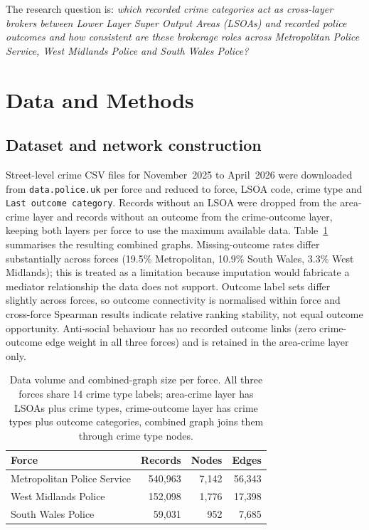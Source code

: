 \documentclass[conference,a4paper]{IEEEtran}
\begin{document}
The research question is: \textit{which recorded crime categories act
as cross-layer brokers between Lower Layer Super Output Areas
(LSOAs) and recorded police
outcomes and how consistent are these brokerage roles across
Metropolitan Police Service, West Midlands Police and South Wales Police?}

\section{Data and Methods}

\subsection{Dataset and network construction}

Street-level crime CSV files for November~2025 to April~2026 were
downloaded from \texttt{data.police.uk} per force and reduced to
force, LSOA code, crime type and \texttt{Last outcome category}.
Records without an LSOA were dropped from the area-crime layer and
records without an outcome from the crime-outcome layer, keeping both
layers per force to use the maximum available data.
Table~\ref{tab:data} summarises the resulting combined graphs.
Missing-outcome rates differ substantially across forces (19.5\%
Metropolitan, 10.9\% South Wales, 3.3\% West Midlands); this is treated
as a limitation because imputation would fabricate a mediator
relationship the data does not support.
Outcome label sets differ slightly across forces, so outcome
connectivity is normalised within force and cross-force
Spearman results indicate relative ranking stability, not
equal outcome opportunity.
Anti-social behaviour has no recorded outcome links (zero crime-outcome
edge weight in all three forces) and is retained in the area-crime
layer only.

\begin{table}[h]
\centering
\small
\caption{Data volume and combined-graph size per force. All three
  forces share 14 crime type labels; area-crime layer has LSOAs plus
  crime types, crime-outcome layer has crime types plus outcome
  categories, combined graph joins them through crime type nodes.}
\label{tab:data}
\begin{tabular}{lrrr}
\toprule
Force & Records & Nodes & Edges \\
\midrule
Metropolitan Police Service & 540{,}963 & 7{,}142 & 56{,}343 \\
West Midlands Police & 152{,}098 & 1{,}776 & 17{,}398 \\
South Wales Police   &  59{,}031 &    952  &  7{,}685 \\
\bottomrule
\end{tabular}
\end{table}
\end{document}
